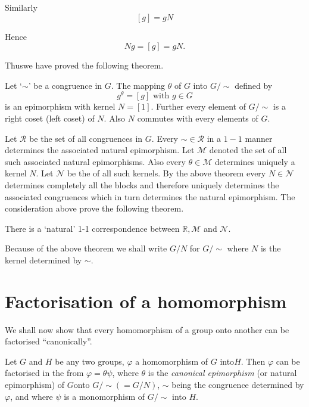Similarly
$$
[g] = gN
$$

Hence 
$$
Ng = [g] = gN.
$$

Thus\pageoriginale we have proved the following theorem.

\begin{theorem}\label{chap3:sec2:thm5} %
  Let `$\sim$' be a congruence in $G$. The mapping $\theta$ of $G$
  into $G/ \sim$ defined by 
  $$
  g^\theta = [g] \text{ with } g \in G
  $$
  is an epimorphism with kernel $N=[1]$. Further every element of $G /
  \sim$ is a right coset (left coset) of $N$. Also $N$ commutes with
  every elements of $G$.  
\end{theorem}

Let $\mathscr{R}$ be the set of all congruences in $G$. Every $\sim
\in  \mathscr{R}$ in a $1-1$ manner determines the associated
natural epimorphism. Let $\mathscr{M}$ denoted the set of all such
associated natural epimorphisms. Also every $\theta \in 
\mathscr{M}$ determines uniquely a kernel $N$. Let $\mathscr{N}$ be
the of all such kernels. By the above theorem every $N \in 
\mathscr{N}$ determines completely all the blocks and therefore
uniquely determines the associated congruences which in turn
determines the natural epimorphism. The consideration above prove the
following  theorem.  

\begin{theorem}\label{chap3:sec2:thm6} %
  There is a `natural' 1-1 correspondence between $\mathbb{R},
  \mathscr{M}$ and $\mathscr{N}$. 

  Because of the above theorem we shall write $G/N$ for $G / \sim$
  where $N$ is the kernel determined by $\sim$. 
\end{theorem}

\section{Factorisation of a homomorphism}\label{chap3:sec3} %

We shall now show that every homomorphism of a group onto another can
be factorised  ``canonically''. 

\begin{theorem}\label{chap3:sec3:thm7} %
  Let $G$ and $H$ be any two groups, $\varphi$ a homomorphism of $G$
  into\pageoriginale $H$. Then $\varphi$ can be factorised in the from
  $\varphi = 
  \theta \psi$, where $\theta$ is the {\em canonical epimorphism} (or
  natural epimorphism) of $G$onto $G/ \sim (= G/N)$, $\sim$ being the
  congruence determined by $\varphi$, and where $\psi$ is a
  monomorphism of $G/ \sim$ into $H$.  
\end{theorem}

